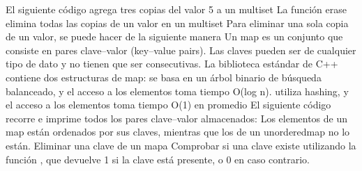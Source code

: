 {}El siguiente código agrega tres copias del valor 5 a un multiset\markdownRendererInterblockSeparator
{}\markdownRendererInterblockSeparator
{}La función erase elimina todas las copias de un valor en un multiset\markdownRendererInterblockSeparator
{}\markdownRendererInterblockSeparator
{}Para eliminar una sola copia de un valor, se puede hacer de la siguiente manera\markdownRendererInterblockSeparator
{}\markdownRendererParagraphSeparator
{}
\markdownRendererSectionEnd 
\markdownRendererSectionEnd \markdownRendererSectionBegin
{}\markdownRendererInterblockSeparator
{}Un map es un conjunto que consiste en pares clave–valor (key–value pairs). Las claves pueden ser de cualquier tipo de dato y no tienen que ser consecutivas.\markdownRendererParagraphSeparator
{}La biblioteca estándar de C++ contiene dos estructuras de map:\markdownRendererInterblockSeparator
{}\markdownRendererUlBeginTight
\markdownRendererUlItem {} se basa en un árbol binario de búsqueda balanceado, y el acceso a los elementos toma tiempo O(log n).\markdownRendererUlItemEnd 
\markdownRendererUlItem {} utiliza hashing, y el acceso a los elementos toma tiempo O(1) en promedio\markdownRendererUlItemEnd 
\markdownRendererUlEndTight \markdownRendererInterblockSeparator
{}\markdownRendererInterblockSeparator
{}El siguiente código recorre e imprime todos los pares clave–valor almacenados:\markdownRendererInterblockSeparator
{}\markdownRendererInterblockSeparator
{}Los elementos de un map están ordenados por sus claves, mientras que los de un unordered\markdownRendererUnderscore{}map no lo están.\markdownRendererParagraphSeparator
{}Eliminar una clave de un mapa\markdownRendererInterblockSeparator
{}\markdownRendererInterblockSeparator
{}Comprobar si una clave existe utilizando la función , que devuelve 1 si la clave está presente, o 0 en caso contrario.\markdownRendererInterblockSeparator

